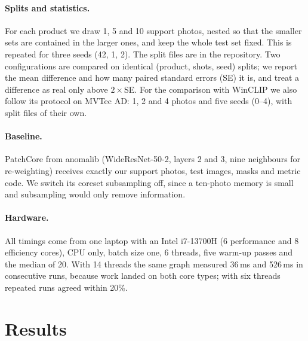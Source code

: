 \documentclass[10pt,twocolumn]{article}
\begin{document}
\paragraph{Splits and statistics.} For each product we draw 1, 5 and 10 support
photos, nested so that the smaller sets are contained in the larger ones, and keep
the whole test set fixed. This is repeated for three seeds (42, 1, 2). The split
files are in the repository. Two configurations are compared on identical
(product, shots, seed) splits; we report the mean difference and how many paired
standard errors (SE) it is, and treat a difference as real only above $2\times$SE.
For the comparison with WinCLIP we also follow its protocol on MVTec AD: 1, 2 and
4 photos and five seeds (0--4), with split files of their own.

\paragraph{Baseline.} PatchCore from anomalib (WideResNet-50-2, layers 2 and 3,
nine neighbours for re-weighting) receives exactly our support photos, test
images, masks and metric code. We switch its coreset subsampling off, since a
ten-photo memory is small and subsampling would only remove information.

\paragraph{Hardware.} All timings come from one laptop with an Intel i7-13700H
(6 performance and 8 efficiency cores), CPU only, batch size one, 6 threads, five
warm-up passes and the median of 20. With 14 threads the same graph measured 36\,ms
and 526\,ms in consecutive runs, because work landed on both core types; with six
threads repeated runs agreed within 20\%.

\section{Results}
\end{document}
